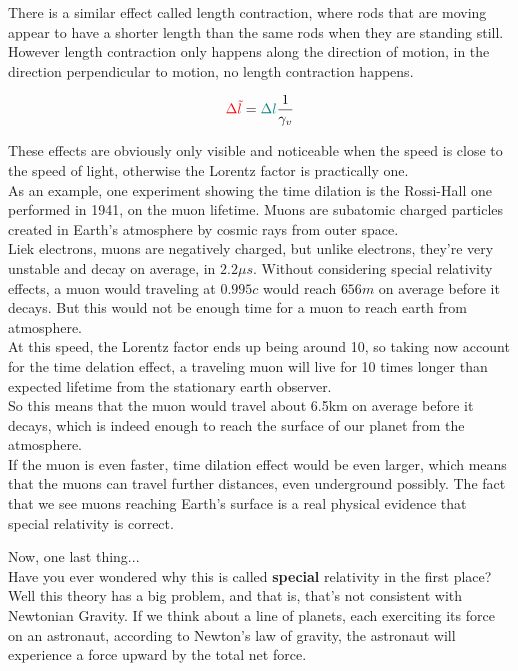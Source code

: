 There is a similar effect called length contraction, where rods that are moving appear to have a shorter length than the same 
rods when they are standing still. However length contraction only happens along the direction of motion, in the direction perpendicular to motion, no length contraction happens.

\begin{equation}
    \begingroup\color{red}\Delta\tilde{l}\endgroup = \begingroup\color{teal}\Delta l\endgroup \frac{1}{\gamma_v}
\end{equation}

These effects are obviously only visible and noticeable when the speed is close to the speed of light, otherwise
the Lorentz factor is practically one.\\

As an example, one experiment showing the time dilation is the Rossi-Hall one performed in 1941, on the muon lifetime.
Muons are subatomic charged particles created in Earth's atmosphere by cosmic rays from outer space.\\
Liek electrons, muons are negatively charged, but unlike electrons, they're very unstable and decay on average, in $2.2 \mu s$.
Without considering special relativity effects, a muon would traveling at $0.995c$ would reach $656m$ on average before it decays.
But this would not be enough time for a muon to reach earth from atmosphere.\\
At this speed, the Lorentz factor ends up being around 10, so taking now account for the time delation effect, a traveling muon will live
for 10 times longer than expected lifetime from the stationary earth observer.\\
So this means that the muon would travel about 6.5km on average before it decays, which is indeed
enough to reach the surface of our planet from the atmosphere.\\

If the muon is even faster, time dilation effect would be even larger, which means that the muons can travel further distances, even underground possibly.
The fact that we see muons reaching Earth's surface is a real physical evidence that special relativity is correct. 

Now, one last thing...\\
Have you ever wondered why this is called \textbf{special} relativity in the first place?
Well this theory has a big problem, and that is, that's not consistent with Newtonian Gravity. If we think about a line of planets, each exerciting its force on 
an astronaut, according to Newton's law of gravity, the astronaut will experience a force upward by the total net force.

